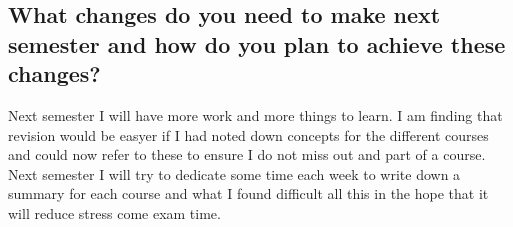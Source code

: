 \documentclass[12pt]{article}
\begin{document}
    \subsection{What changes do you need to make next semester and how do
      you plan to achieve these changes?}
      Next semester I will have more work and more things to learn. I am finding
      that revision would be easyer if I had noted down concepts for the 
      different courses and could now refer to these to ensure I do not miss out
      and part of a course.
      Next semester I will try to dedicate some time each week to write down a 
      summary for each course and what I found difficult all this in the hope
      that it will reduce stress come exam time.
\end{document}
